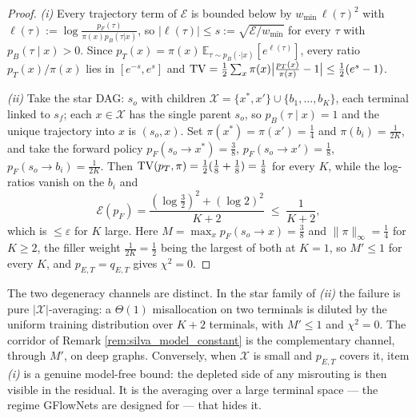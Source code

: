 \begin{proof}
\emph{(i)} Every trajectory term of $\mathcal E$ is bounded below by $w_{\min}\,\ell(\tau)^2$ with $\ell(\tau) := \log\frac{p_F(\tau)}{\pi(x)p_B(\tau|x)}$, so $|\ell(\tau)|\leq s := \sqrt{\mathcal E/w_{\min}}$ for every $\tau$ with $p_B(\tau\mid x)>0$. Since $p_T(x) = \pi(x)\,\mathbb E_{\tau\sim p_B(\cdot|x)}[e^{\ell(\tau)}]$, every ratio $p_T(x)/\pi(x)$ lies in $[e^{-s},e^{s}]$ and $\mathrm{TV} = \frac12\sum_x \pi(x)\bigl|\tfrac{p_T(x)}{\pi(x)}-1\bigr| \leq \frac12(e^{s}-1)$.

\emph{(ii)} Take the star DAG: $s_o$ with children $\mathcal X = \{x^*, x'\} \cup \{b_1,\dots,b_K\}$, each terminal linked to $s_f$; each $x\in\mathcal X$ has the single parent $s_o$, so $p_B(\tau\mid x)=1$ and the unique trajectory into $x$ is $(s_o,x)$. Set $\pi(x^*)=\pi(x')=\frac14$ and $\pi(b_i)=\frac1{2K}$, and take the forward policy $p_F(s_o\rightarrow x^*)=\frac38$, $p_F(s_o\rightarrow x')=\frac18$, $p_F(s_o\rightarrow b_i)=\frac1{2K}$. Then $\mathrm{TV}(p_T,\pi) = \frac12(\frac18+\frac18)=\frac18$ for every $K$, while the log-ratios vanish on the $b_i$ and
\begin{equation}
    \mathcal E(p_F) = \frac{\left(\log\frac32\right)^2 + \left(\log 2\right)^2}{K+2} \;\leq\; \frac{1}{K+2},
\end{equation}
which is $\leq\varepsilon$ for $K$ large. Here $M = \max_x p_F(s_o\rightarrow x) = \frac38$ and $\|\pi\|_\infty=\frac14$ for $K\geq2$, the filler weight $\frac1{2K}=\frac12$ being the largest of both at $K=1$, so $M'\leq 1$ for every $K$, and $p_{E,T}=q_{E,T}$ gives $\chi^2=0$.
\end{proof}

\begin{remark}\label{rem:silva_two_channels}
The two degeneracy channels are distinct. In the star family of \emph{(ii)} the failure is pure $|\mathcal X|$-averaging: a $\Theta(1)$ misallocation on two terminals is diluted by the uniform training distribution over $K+2$ terminals, with $M'\leq1$ and $\chi^2=0$. The corridor of Remark \ref{rem:silva_model_constant} is the complementary channel, through $M'$, on deep graphs. Conversely, when $\mathcal X$ is small and $p_{E,T}$ covers it, item \emph{(i)} is a genuine model-free bound: the depleted side of any misrouting is then visible in the residual. It is the averaging over a large terminal space --- the regime GFlowNets are designed for --- that hides it.
\end{remark}

